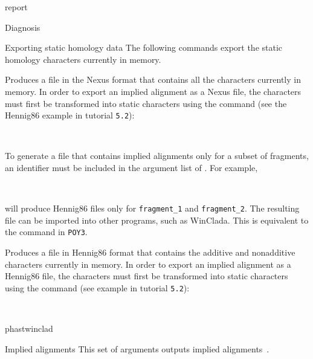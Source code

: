 \begin{command}{report}{}
\begin{arguments}
\begin{argumentgroup}{Diagnosis}
\end{argumentgroup} 

\begin{argumentgroup}{Exporting static homology data}
{The following commands export the static homology characters
currently in memory.}

{Produces a file in the Nexus format that contains all the
characters currently in memory. In
order to export an implied alignment as a Nexus file, the
characters must first be transformed into static characters
using the  command (see the Hennig86 
example in tutorial \texttt{5.2}): 
\begin{flushleft}
 \\
\end{flushleft}}
{}

\begin{statement}
To generate a file that contains implied
alignments only for a subset of fragments, an identifier must be
included in the argument list of . For
example, 
\begin{flushleft}
 \\
\end{flushleft}
will produce Hennig86 files only for
\texttt{fragment\_1} and \texttt {fragment\_2}. The resulting file can 
be imported into other programs,
such as WinClada. This is equivalent to the
 command in \texttt{POY3}.
\end{statement}

{Produces a file in Hennig86 format that contains the
additive and nonadditive characters currently in memory. In
order to export an implied alignment as a Hennig86 file, the
characters must first be transformed into static characters
using the  command (see example in tutorial \texttt{5.2}): 
\begin{flushleft}
 \\
\end{flushleft}}
{phastwinclad}

\end{argumentgroup}

\begin{argumentgroup}{Implied alignments}
{This set of arguments outputs implied alignments~\cite{wheeler2003}.} 


\end{argumentgroup}
\end{arguments}
\end{command}
